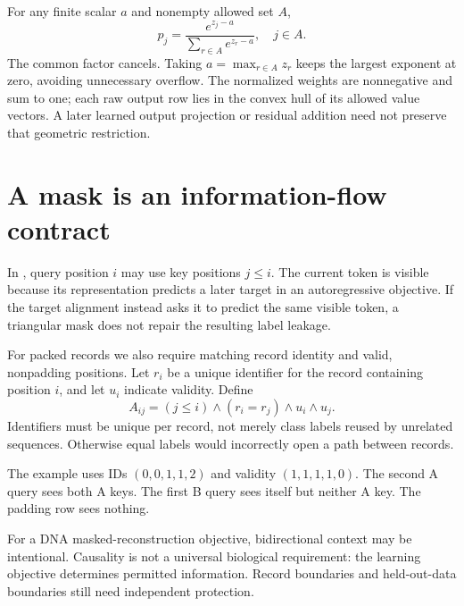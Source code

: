 For any finite scalar $a$ and nonempty allowed set $A$,
\begin{equation}
p_j=\frac{e^{z_j-a}}{\sum_{r\in A}e^{z_r-a}},\quad j\in A.
\end{equation}
The common factor cancels. Taking $a=\max_{r\in A}z_r$ keeps the largest exponent at zero, avoiding unnecessary overflow. The normalized weights are nonnegative and sum to one; each raw output row lies in the convex hull of its allowed value vectors. A later learned output projection or residual addition need not preserve that geometric restriction.

\section{A mask is an information-flow contract}

In , query position $i$ may use key positions $j\leq i$. The current token is visible because its representation predicts a later target in an autoregressive objective. If the target alignment instead asks it to predict the same visible token, a triangular mask does not repair the resulting label leakage.

For packed records we also require matching record identity and valid, nonpadding positions. Let $r_i$ be a unique identifier for the record containing position $i$, and let $u_i$ indicate validity. Define
\begin{equation}
A_{ij}=(j\leq i)\land(r_i=r_j)\land u_i\land u_j.
\label{eq:mask}
\end{equation}
Identifiers must be unique per record, not merely class labels reused by unrelated sequences. Otherwise equal labels would incorrectly open a path between records.



The example uses IDs $(0,0,1,1,2)$ and validity $(1,1,1,1,0)$. The second A query sees both A keys. The first B query sees itself but neither A key. The padding row sees nothing.

For a DNA masked-reconstruction objective, bidirectional context may be intentional. Causality is not a universal biological requirement: the learning objective determines permitted information. Record boundaries and held-out-data boundaries still need independent protection.

